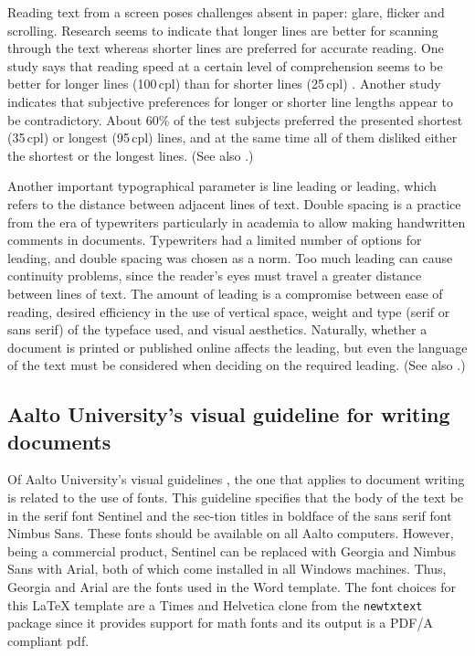 \documentclass[english, 12pt, a4paper, elec, utf8, a-2b, online]{aaltothesis}
\begin{document}
Reading text from a screen poses challenges absent in paper: glare, flicker and 
scrolling. Research seems to indicate that longer lines are better for scanning 
through the text whereas shorter lines are preferred for accurate reading. One 
study says that reading speed at a certain level of comprehension seems to be 
better for longer lines (100\,cpl) than for shorter lines (25\,cpl) 
\cite{Dyson}. Another study \cite{Shaik} indicates that subjective preferences 
for longer or shorter line lengths appear to be contradictory. About 60\% of 
the test subjects preferred the presented shortest (35\,cpl) or longest 
(95\,cpl) lines, and at the same time all of them disliked either the 
shortest or the longest lines. (See also \cite{Wikilinelength}.)

Another important typographical parameter is line leading or leading, which 
refers to the distance between adjacent lines of text. Double spacing is a 
practice from the era of typewriters particularly in academia to allow making 
handwritten comments in documents. Typewriters had a limited number of options 
for leading, and double spacing was chosen as a norm. Too much leading can cause
continuity problems, since the reader’s eyes must travel a greater distance 
between lines of text. The amount of leading is a compromise between ease of 
reading, desired efficiency in the use of vertical space, weight and type (serif
or sans serif) of the typeface used, and visual aesthetics. Naturally, whether a
document is printed or published online affects the leading, but even the 
language of the text must be considered when deciding on the required leading. 
(See also \cite{enwiki:1026690618}.)

\subsection*{Aalto University’s visual guideline for writing documents}

Of Aalto University’s visual guidelines \cite{aaltovisual}, the one that applies
to document writing is related to the use of fonts. This guideline specifies 
that the body of the text be in the serif font Sentinel and the sec-tion titles 
in boldface of the sans serif font Nimbus Sans. These fonts should be available 
on all Aalto computers. However, being a commercial product, Sentinel can be 
replaced with Georgia and Nimbus Sans with Arial, both of which come installed 
in all Windows machines. Thus, Georgia and Arial are the fonts used in the Word 
template. The font choices for this \LaTeX{} template are a Times and Helvetica 
clone from the \verb+newtxtext+ package since it provides support for math fonts
and its output is a PDF/A compliant pdf.
\end{document}

